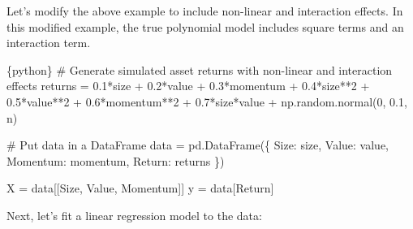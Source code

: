 \documentclass[
  letterpaper,
  DIV=11,
  numbers=noendperiod]{scrartcl}
\newenvironment{Shaded}{\begin{snugshade}}{\end{snugshade}}
\newcommand{\CommentTok}[1]{\textcolor[rgb]{0.37,0.37,0.37}{#1}}
\newcommand{\DecValTok}[1]{\textcolor[rgb]{0.68,0.00,0.00}{#1}}
\newcommand{\FloatTok}[1]{\textcolor[rgb]{0.68,0.00,0.00}{#1}}
\newcommand{\InformationTok}[1]{\textcolor[rgb]{0.37,0.37,0.37}{#1}}
\newcommand{\NormalTok}[1]{\textcolor[rgb]{0.00,0.23,0.31}{#1}}
\newcommand{\OperatorTok}[1]{\textcolor[rgb]{0.37,0.37,0.37}{#1}}
\newcommand{\StringTok}[1]{\textcolor[rgb]{0.13,0.47,0.30}{#1}}
\begin{document}
Let's modify the above example to include non-linear and interaction
effects. In this modified example, the true polynomial model includes
square terms and an interaction term.

\begin{Shaded}
\begin{Highlighting}[]
\InformationTok{\textasciigrave{}\textasciigrave{}\textasciigrave{}\{python\}}
\CommentTok{\# Generate simulated asset returns with non{-}linear and interaction effects}
\NormalTok{returns }\OperatorTok{=} \FloatTok{0.1}\OperatorTok{*}\NormalTok{size }\OperatorTok{+} \FloatTok{0.2}\OperatorTok{*}\NormalTok{value }\OperatorTok{+} \FloatTok{0.3}\OperatorTok{*}\NormalTok{momentum }\OperatorTok{+} \FloatTok{0.4}\OperatorTok{*}\NormalTok{size}\OperatorTok{**}\DecValTok{2} \OperatorTok{+} \FloatTok{0.5}\OperatorTok{*}\NormalTok{value}\OperatorTok{**}\DecValTok{2} \OperatorTok{+} \FloatTok{0.6}\OperatorTok{*}\NormalTok{momentum}\OperatorTok{**}\DecValTok{2} \OperatorTok{+} \FloatTok{0.7}\OperatorTok{*}\NormalTok{size}\OperatorTok{*}\NormalTok{value }\OperatorTok{+}\NormalTok{ np.random.normal(}\DecValTok{0}\NormalTok{, }\FloatTok{0.1}\NormalTok{, n)}

\CommentTok{\# Put data in a DataFrame}
\NormalTok{data }\OperatorTok{=}\NormalTok{ pd.DataFrame(\{}
    \StringTok{\textquotesingle{}Size\textquotesingle{}}\NormalTok{: size,}
    \StringTok{\textquotesingle{}Value\textquotesingle{}}\NormalTok{: value,}
    \StringTok{\textquotesingle{}Momentum\textquotesingle{}}\NormalTok{: momentum,}
    \StringTok{\textquotesingle{}Return\textquotesingle{}}\NormalTok{: returns}
\NormalTok{\})}

\NormalTok{X }\OperatorTok{=}\NormalTok{ data[[}\StringTok{\textquotesingle{}Size\textquotesingle{}}\NormalTok{, }\StringTok{\textquotesingle{}Value\textquotesingle{}}\NormalTok{, }\StringTok{\textquotesingle{}Momentum\textquotesingle{}}\NormalTok{]]}
\NormalTok{y }\OperatorTok{=}\NormalTok{ data[}\StringTok{\textquotesingle{}Return\textquotesingle{}}\NormalTok{]}
\InformationTok{\textasciigrave{}\textasciigrave{}\textasciigrave{}}
\end{Highlighting}
\end{Shaded}

Next, let's fit a linear regression model to the data:
\end{document}
